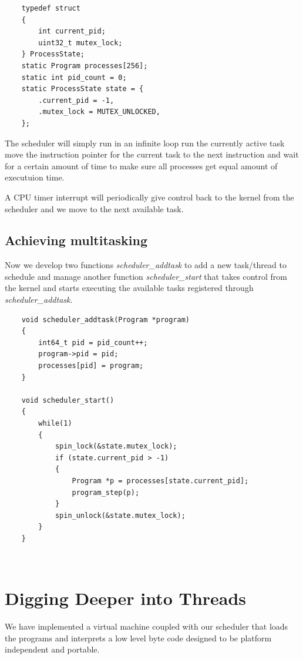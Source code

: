 \documentclass[12pt]{report}
\begin{document}
	\begin{verbatim}
	typedef struct
	{
		int current_pid;
		uint32_t mutex_lock;
	} ProcessState;
	static Program processes[256];
	static int pid_count = 0;
	static ProcessState state = {
   	    .current_pid = -1,
   	    .mutex_lock = MUTEX_UNLOCKED,
	};
	\end{verbatim}
	
	The scheduler will simply run in an infinite loop run the currently active task
	move the instruction pointer for the current task to the next instruction and wait for
	a certain amount of time to make sure all processes get equal amount of executuion time.
	
	A CPU timer interrupt will periodically give control back to the kernel from the
	scheduler and we move to the next available task.

    \section{Achieving multitasking}
    Now we develop two functions \textit{scheduler\_addtask} to add a new task/thread
    to schedule and manage another function \textit{scheduler\_start} that takes control from
    the kernel and starts executing the available tasks registered through \textit{scheduler\_addtask}.

    \begin{verbatim}
    void scheduler_addtask(Program *program)
    {
        int64_t pid = pid_count++;
        program->pid = pid;
        processes[pid] = program;
    }

    void scheduler_start()
    {
        while(1) 
        {
            spin_lock(&state.mutex_lock);
            if (state.current_pid > -1)
            {
                Program *p = processes[state.current_pid];
                program_step(p);
            }
            spin_unlock(&state.mutex_lock);
        }
    }
    \end{verbatim}
    
    \begin{verbatim}
        
    \end{verbatim}

    \chapter{Digging Deeper into Threads}
    We have implemented a virtual machine coupled with our scheduler that loads the programs and interprets a low level byte code designed to be 
    platform independent and portable.
\end{document}
